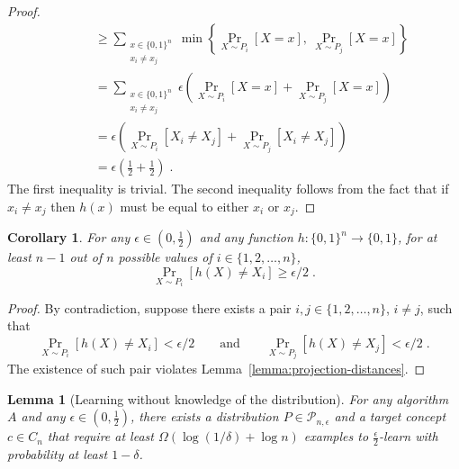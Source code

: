 \documentclass[12pt]{article}
\newtheorem{lemma}[proposition]{Lemma}
\newtheorem{corollary}[proposition]{Corollary}
\renewcommand{\P}{\mathcal{P}}
\begin{document}
\begin{proof}
\begin{align*}
& \qquad \ge \sum_{\substack{x \in \{0,1\}^n \\ x_i \neq x_j}} \min \left\{ \Pr_{X \sim P_i}[X = x], \ \Pr_{X \sim P_j}[X = x] \right\} \\
& \qquad = \sum_{\substack{x \in \{0,1\}^n \\ x_i \neq x_j}} \epsilon \left( \Pr_{X \sim P_i}[X = x] + \Pr_{X \sim P_j}[X = x] \right) \\
& \qquad = \epsilon \left( \Pr_{X \sim P_i}[X_i \neq X_j] + \Pr_{X \sim P_j}[X_i \neq X_j] \right) \\
& \qquad = \epsilon \left( \frac{1}{2} + \frac{1}{2} \right) \; .
\end{align*}
The first inequality is trivial. The second inequality follows from the fact that
if $x_i \neq x_j$ then $h(x)$ must be equal to either $x_i$ or $x_j$.
\end{proof}

\begin{corollary}
\label{corollary:projection-distances}
For any $\epsilon \in (0,\frac{1}{2})$ and any function $h:\{0,1\}^n \to \{0,1\}$,
for at least $n-1$ out of $n$ possible values of $i \in \{1,2,\dots,n\}$,
$$
\Pr_{X \sim P_i}[h(X) \neq X_i] \ge \epsilon/2 \; .
$$
\end{corollary}

\begin{proof}
By contradiction, suppose there exists a pair $i,j \in \{1,2,\dots,n\}$, $i \neq j$, such that
$$
\Pr_{X \sim P_i}[h(X) \neq X_i] < \epsilon/2 \qquad \text{and} \qquad \Pr_{X \sim P_j}[h(X) \neq X_j] < \epsilon/2 \; .
$$
The existence of such pair violates Lemma~\ref{lemma:projection-distances}.
\end{proof}


\begin{lemma}[Learning without knowledge of the distribution]
For any algorithm $A$ and any $\epsilon \in (0,\frac{1}{2})$,
there exists a distribution $P \in \P_{n,\epsilon}$
and a target concept $c \in C_n$ that require at least $\Omega(\log(1/\delta) + \log n)$
examples to $\frac{\epsilon}{2}$-learn with probability at least $1 - \delta$.
\end{lemma}
\end{document}
